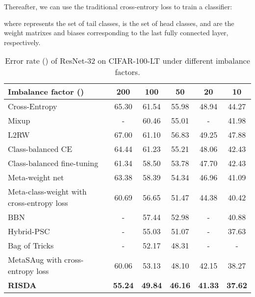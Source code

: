 \documentclass[letterpaper]{article} \usepackage{aaai22}  \usepackage{times}  \usepackage{helvet}  \usepackage{courier}  \usepackage[hyphens]{url}  \usepackage{graphicx} \usepackage{bm}
\begin{document}
	Thereafter, we can use the traditional cross-entrory loss to train a classifier: 
	
	
	where  represents the set of tail classes,  is the set of head classes,
	 and  are the weight matrixes and
	biases corresponding to the last fully connected layer, respectively.
	\begin{table*}[!pt]
		\centering
		\begin{tabular}{lccccc}
			\toprule
			Imbalance factor ()      & 200   & 100   & 50    & 20    & 10 \\
			\midrule
			Cross-Entropy      & 65.30 & 61.54 & 55.98 & 48.94 & 44.27 \\ 
			Mixup \cite{zhang2017mixup}     &-       &60.46       &55.01       &-       &41.98       \\ 
			L2RW \cite{ren2018learning}        &67.00       &61.10       &56.83       &49.25       &47.88       \\ 
			Class-balanced CE \cite{cui2019class}         &64.44       &61.23       &55.21       &48.06       &42.43       \\ 
			Class-balanced  fine-tuning \cite{DBLP:conf/cvpr/CuiSSHB18}         &61.34       &58.50       &53.78       &47.70       &42.43       \\ 
			Meta-weight net \cite{shu2019meta}                           &63.38      &58.39       &54.34      &46.96       &41.09       \\ 
			Meta-class-weight with cross-entropy loss \cite{jamal2020rethinking} &60.69       &56.65       &51.47       &44.38       &40.42       \\ 
			BBN \cite{zhou2020bbn}                                       &-       &57.44       &52.98       &-       &40.88       \\ 
			Hybrid-PSC \cite{wang2021contrastive}                                &-       &55.03       & 51.07      &-      &37.63       \\ 
			Bag of Tricks \cite{zhang2021bag}                           &-       &52.17       &48.31       &-       &-       \\ 
			MetaSAug with cross-entropy loss \cite{li2021metasaug}          &60.06       &53.13       &48.10       &42.15       &38.27       \\ 
			\textbf{RISDA}                                 &\textbf{55.24}       &\textbf{49.84}       &\textbf{46.16}       &\textbf{41.33}         &\textbf{37.62}       \\ 
			\bottomrule
		\end{tabular}
		\caption{Error rate () of ResNet-32 on CIFAR-100-LT under different imbalance factors.}
		\label{tab1}
	\end{table*}
	
\end{document}
